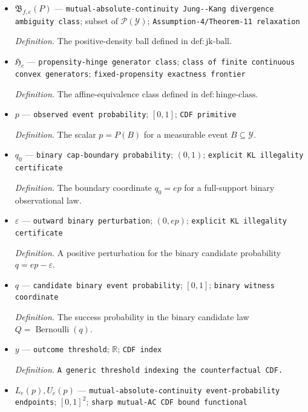 \documentclass{article}
\begin{document}
\begin{itemize}
  \par\smallskip\noindent\emph{Definition.} The \(R\ll P\) mixture class defined in \(\mathrm{def:mixture\text{-}class}\).
  \item \(\mathfrak B_{f,e}(P)\) --- \texttt{mutual-\allowbreak{}absolute-\allowbreak{}continuity Jung-\allowbreak{}-\allowbreak{}Kang divergence ambiguity class}; subset of \(\mathcal P(\mathcal Y)\); \texttt{Assumption-\allowbreak{}4/\allowbreak{}Theorem-\allowbreak{}11 relaxation}
  \par\smallskip\noindent\emph{Definition.} The positive-density ball defined in \(\mathrm{def:jk\text{-}ball}\).
  \item \(\mathfrak H_c\) --- \texttt{propensity-\allowbreak{}hinge generator class}; \texttt{class of finite continuous convex generators}; \texttt{fixed-\allowbreak{}propensity exactness frontier}
  \par\smallskip\noindent\emph{Definition.} The affine-equivalence class defined in \(\mathrm{def:hinge\text{-}class}\).
  \item \(p\) --- \texttt{observed event probability}; \([0,1]\); \texttt{CDF primitive}
  \par\smallskip\noindent\emph{Definition.} The scalar \(p=P(B)\) for a measurable event \(B\subseteq\mathcal Y\).
  \item \(q_0\) --- \texttt{binary cap-\allowbreak{}boundary probability}; \((0,1)\); \texttt{explicit KL illegality certificate}
  \par\smallskip\noindent\emph{Definition.} The boundary coordinate \(q_0=ep\) for a full-support binary observational law.
  \item \(\varepsilon\) --- \texttt{outward binary perturbation}; \((0,ep)\); \texttt{explicit KL illegality certificate}
  \par\smallskip\noindent\emph{Definition.} A positive perturbation for the binary candidate probability \(q=ep-\varepsilon\).
  \item \(q\) --- \texttt{candidate binary event probability}; \([0,1]\); \texttt{binary witness coordinate}
  \par\smallskip\noindent\emph{Definition.} The success probability in the binary candidate law \(Q=\operatorname{Bernoulli}(q)\).
  \item \(y\) --- \texttt{outcome threshold}; \(\mathbb R\); \texttt{CDF index}
  \par\smallskip\noindent\emph{Definition.} \texttt{A generic threshold indexing the counterfactual CDF.}
  \item \(L_e(p),U_e(p)\) --- \texttt{mutual-\allowbreak{}absolute-\allowbreak{}continuity event-\allowbreak{}probability endpoints}; \([0,1]^2\); \texttt{sharp mutual-\allowbreak{}AC CDF bound functional}

\end{itemize}
\end{document}
